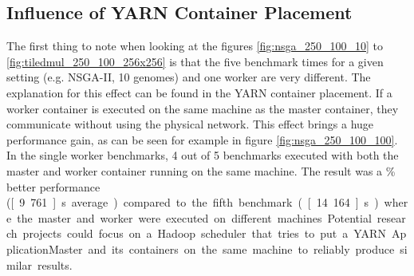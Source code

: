 



\subsection{Influence of YARN Container Placement}
The first thing to note when looking at the figures \ref{fig:nsga_250_100_10} to \ref{fig:tiledmul_250_100_256x256} is that the five benchmark times for a given setting (e.g. NSGA-II, 10 genomes) and one worker are very different. The explanation for this effect can be found in the YARN container placement. If a worker container is executed on the same machine as the master container, they communicate without using the physical network. This effect brings a huge performance gain, as can be seen for example in figure \ref{fig:nsga_250_100_100}. In the single worker benchmarks, 4 out of 5 benchmarks executed with both the master and worker container running on the same machine. The result was a \unit[50]{\%} better performance (\unit[9.761]{s} average) compared to the fifth benchmark (\unit[14.164]{s}) where the master and worker were executed on different machines. Potential research projects could focus on a Hadoop scheduler that tries to put a YARN ApplicationMaster and its containers on the same machine to reliably produce similar results.

